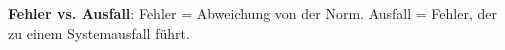 \documentclass[8pt, landscape]{article}
\newcommand{\algo}[1]{\textbf{\textcolor{blue!60!black}{#1}}}
\begin{document}
\begin{multicols*}{4}
\begin{tabularx}{\linewidth}{l >{\RaggedRight}X  >{\RaggedRight}X}
\bottomrule
\end{tabularx}
\endgroup

\algo{Fehler vs. Ausfall}: Fehler = Abweichung von der Norm. Ausfall = Fehler, der zu einem Systemausfall führt.

\end{multicols*}
\end{document}
